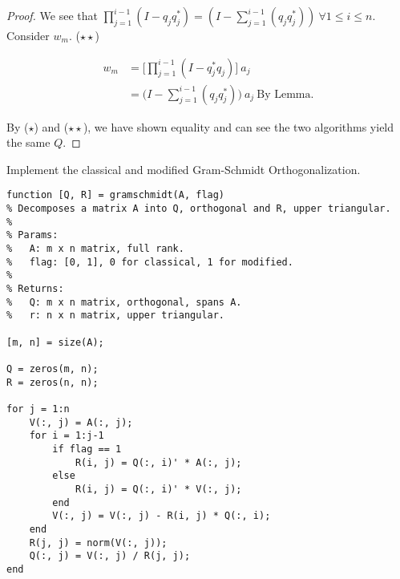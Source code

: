 \documentclass[12pt]{article}
\newenvironment{exercise}[2][Exercise]{\begin{trivlist}
\item[\hskip \labelsep{\bfseries #1}\hskip \labelsep{\bfseries #2.}]}{\end{trivlist}}
\begin{document}
\begin{exercise}{1}
\begin{proof}
        \noindent We see that $\prod_{j=1}^{i-1} (I - q_j q_j^*) = (I - \sum_{j=1}^{i-1} (q_j q_j^*))\ \forall 1 \leq i \leq n$. \\

        \noindent Consider $w_m$. ($\star\star$)

        \begin{align*}
            w_m
            & = \Big[\prod_{j=1}^{i-1} (I - q_j^* q_j) \Big]\ a_j \\
            & = \Big(I - \sum_{j=1}^{i-1} (q_j q_j^*)\Big)\ a_j\ \text{By Lemma.}
        \end {align*}

        \noindent By ($\star$) and ($\star\star$), we have shown equality and can see the two algorithms yield the same $Q$.

    \end{proof}

\end{exercise}

\pagebreak

\begin{exercise}{2} Implement the classical and modified Gram-Schmidt Orthogonalization.

    \begin{verbatim}
function [Q, R] = gramschmidt(A, flag)
% Decomposes a matrix A into Q, orthogonal and R, upper triangular.
%
% Params:
%   A: m x n matrix, full rank.
%   flag: [0, 1], 0 for classical, 1 for modified.
%
% Returns:
%   Q: m x n matrix, orthogonal, spans A.
%   r: n x n matrix, upper triangular.

[m, n] = size(A);

Q = zeros(m, n);
R = zeros(n, n);

for j = 1:n
    V(:, j) = A(:, j);
    for i = 1:j-1
        if flag == 1
            R(i, j) = Q(:, i)' * A(:, j);
        else
            R(i, j) = Q(:, i)' * V(:, j);
        end
        V(:, j) = V(:, j) - R(i, j) * Q(:, i);
    end
    R(j, j) = norm(V(:, j));
    Q(:, j) = V(:, j) / R(j, j);
end
    \end{verbatim}

\end{exercise}

\pagebreak
\end{document}
